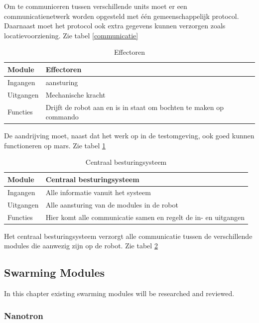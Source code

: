 \documentclass[10pt,a4paper]{article}
\begin{document}
Om te communiceren tussen verschillende units moet er een communicatienetwerk worden opgesteld met \'e\'en gemeenschappelijk protocol. Daarnaast moet het protocol ook extra gegevens kunnen verzorgen zoals locatievoorziening. Zie tabel \ref{communicatie} \\

\begin{table}[H]
\centering
\caption{Effectoren}
\label{Effectoren}
\begin{tabular}{|l|l|}
\hline
Module    & Effectoren \\ \hline
Ingangen  & aansturing  \\ \hline
Uitgangen & Mechanische kracht   \\ \hline
Functies  & Drijft de robot aan en is in staat om bochten te maken op commando            \\ \hline
\end{tabular}
\end{table}

De aandrijving moet, naast dat het werk op in de testomgeving, ook goed kunnen functioneren op mars. Zie tabel \ref{Effectoren} \\

\begin{table}[H]
\centering
\caption{Centraal besturingsysteem}
\label{Centraal besturingsysteem}
\begin{tabular}{|l|l|}
\hline
Module    & Centraal besturingsysteem \\ \hline
Ingangen  & Alle informatie vanuit het systeem  \\ \hline
Uitgangen & Alle aansturing van de modules in de robot \\ \hline
Functies  & Hier komt alle communicatie samen en regelt de in- en uitgangen            \\ \hline
\end{tabular}
\end{table}

Het centraal besturingsysteem verzorgt alle communicatie tussen de verschillende modules die aanwezig zijn op de robot. Zie tabel \ref{Centraal besturingsysteem}

\newpage
\subsection{Swarming Modules}

In this chapter existing swarming modules will be researched and reviewed.

\subsubsection{Nanotron}
\end{document}
